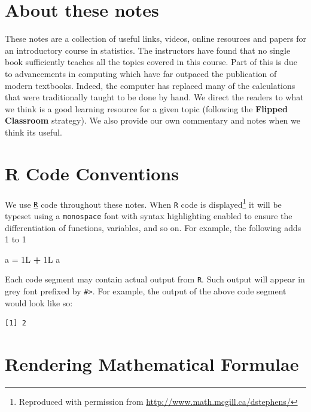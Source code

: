 \documentclass[]{book}
\makeatletter
\newenvironment{Shaded}{\begin{snugshade}}{\end{snugshade}}
\newcommand{\StringTok}[1]{\textcolor[rgb]{0.31,0.60,0.02}{#1}}
\newcommand{\OperatorTok}[1]{\textcolor[rgb]{0.81,0.36,0.00}{\textbf{#1}}}
\newcommand{\NormalTok}[1]{#1}
\let\rmarkdownfootnote\footnote%
\def\footnote{\protect\rmarkdownfootnote}
\newenvironment{kframe}{%
\medskip{}
\setlength{\fboxsep}{.8em}
 \def\at@end@of@kframe{}%
 \ifinner\ifhmode%
  \def\at@end@of@kframe{\end{minipage}}%
  \begin{minipage}{\columnwidth}%
 \fi\fi%
 \def\FrameCommand##1{\hskip\@totalleftmargin \hskip-\fboxsep
 \colorbox{shadecolor}{##1}\hskip-\fboxsep
     \hskip-\linewidth \hskip-\@totalleftmargin \hskip\columnwidth}%
 \MakeFramed {\advance\hsize-\width
   \@totalleftmargin\z@ \linewidth\hsize
   \@setminipage}}%
 {\par\unskip\endMakeFramed%
 \at@end@of@kframe}
\renewenvironment{Shaded}{\begin{kframe}}{\end{kframe}}
\theoremstyle{definition}
\theoremstyle{definition}
\theoremstyle{definition}
\theoremstyle{remark}
\makeatother
\begin{document}
\section*{About these notes}\label{about-these-notes}

These notes are a collection of useful links, videos, online resources
and papers for an introductory course in statistics. The instructors
have found that no single book sufficiently teaches all the topics
covered in this course. Part of this is due to advancements in computing
which have far outpaced the publication of modern textbooks. Indeed, the
computer has replaced many of the calculations that were traditionally
taught to be done by hand. We direct the readers to what we think is a
good learning resource for a given topic (following the \textbf{Flipped
Classroom} strategy). We also provide our own commentary and notes when
we think its useful.

\section*{R Code Conventions}\label{r-code-conventions}

We use \href{https://cran.r-project.org/}{\texttt{R}} code throughout
these notes. When \texttt{R} code is displayed\footnote{Reproduced with
  permission from \url{http://www.math.mcgill.ca/dstephens/}} it will be
typeset using a \texttt{monospace} font with syntax highlighting enabled
to ensure the differentiation of functions, variables, and so on. For
example, the following adds 1 to 1

\begin{Shaded}
\begin{Highlighting}[]
\NormalTok{a =}\StringTok{ }\NormalTok{1L }\OperatorTok{+}\StringTok{ }\NormalTok{1L}
\NormalTok{a}
\end{Highlighting}
\end{Shaded}

Each code segment may contain actual output from \texttt{R}. Such output
will appear in grey font prefixed by \texttt{\#\textgreater{}}. For
example, the output of the above code segment would look like so:

\begin{verbatim}
[1] 2
\end{verbatim}

\section*{Rendering Mathematical
Formulae}\label{rendering-mathematical-formulae}
\end{document}
